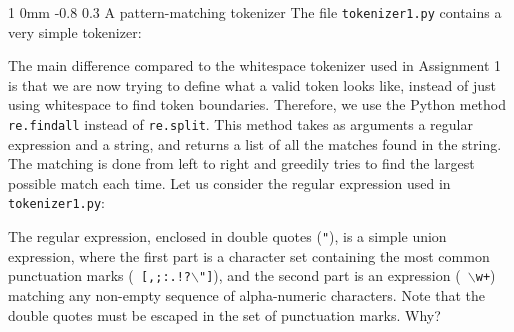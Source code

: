 \documentclass[11pt]{article}
\makeatletter
\newcommand{\newsec}[2]{\section{#1}\label{sec:#2}\noindent}
\renewcommand{\section}{\@startsection
{section}%
{1}%
{0mm}%
{-0.8\baselineskip}%
{0.3\baselineskip}%
{\bfseries\large}}%
\renewcommand{\paragraph}{%
  \@startsection{paragraph}{4}%
  {\z@}{1.5ex \@plus 1ex \@minus .2ex}{-1em}%
  {\normalfont\normalsize\bfseries}%
}\makeatother
\makeatother
\begin{document}
\newsec{A pattern-matching tokenizer}{tokenize}%
The file {\tt tokenizer1.py} contains a very simple tokenizer:
\begin{center}
\fbox{

}
\end{center}
The main difference compared to the whitespace tokenizer used in
Assignment 1 is that we are now trying to define what a valid token
looks like, instead of just using whitespace to find token
boundaries. Therefore, we use the Python method {\tt re.findall}
instead of {\tt re.split}. This method takes as arguments a regular
expression and a string, and returns a list of all the matches found
in the string. The matching is done from left to right and greedily
tries to find the largest possible match each time. Let us consider
the regular expression used in {\tt tokenizer1.py}:
\begin{center}
\fbox{

}
\end{center}
The regular expression, enclosed in double quotes ({\tt "}), is a
simple union expression, where the first part is a character set
containing the most common punctuation marks ({\tt
  [,;:.!?$\backslash$"]}), and the second part is an expression ({\tt
  $\backslash$w+}) matching any non-empty sequence of alpha-numeric
characters. Note that the double quotes must be escaped in the set of
punctuation marks. Why?

\end{document}
